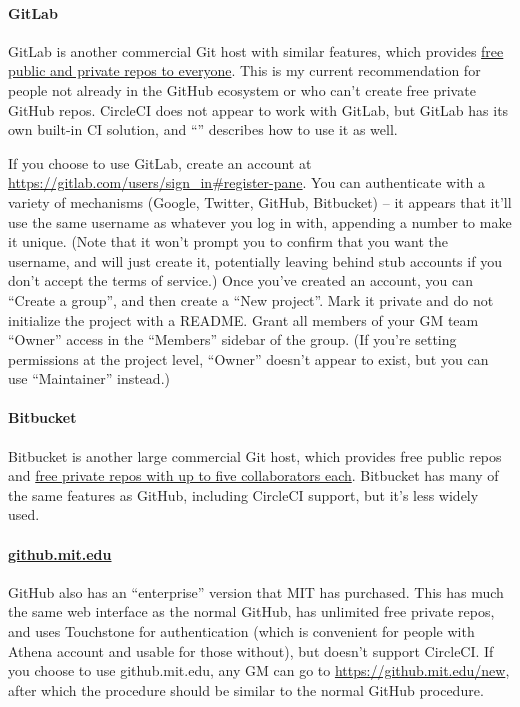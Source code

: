 \documentclass[green]{testgame}
\begin{document}
\paragraph*{GitLab} GitLab is another commercial Git host with similar features, which provides \href{https://about.gitlab.com/pricing/}{free public and private repos to everyone}. This is my current recommendation for people not already in the GitHub ecosystem or who can't create free private GitHub repos. CircleCI does not appear to work with GitLab, but GitLab has its own built-in CI solution, and ``\gCI{}'' describes how to use it as well.

If you choose to use GitLab, create an account at \url{https://gitlab.com/users/sign_in#register-pane}. You can authenticate with a variety of mechanisms (Google, Twitter, GitHub, Bitbucket) -- it appears that it'll use the same username as whatever you log in with, appending a number to make it unique. (Note that it won't prompt you to confirm that you want the username, and will just create it, potentially leaving behind stub accounts if you don't accept the terms of service.) Once you've created an account, you can ``Create a group'', and then create a ``New project''. Mark it private and do not initialize the project with a README. Grant all members of your GM team ``Owner'' access in the ``Members'' sidebar of the group. (If you're setting permissions at the project level, ``Owner'' doesn't appear to exist, but you can use ``Maintainer'' instead.)

\paragraph*{Bitbucket} Bitbucket is another large commercial Git host, which provides free public repos and \href{https://bitbucket.org/product/pricing/}{free private repos with up to five collaborators each}. Bitbucket has many of the same features as GitHub, including CircleCI support, but it's less widely used.

\paragraph*{\href{https://github.mit.edu}{github.mit.edu}} GitHub also has an ``enterprise'' version that MIT has purchased. This has much the same web interface as the normal GitHub, has unlimited free private repos, and uses Touchstone for authentication (which is convenient for people with Athena account and usable for those without), but doesn't support CircleCI. If you choose to use github.mit.edu, any GM can go to \url{https://github.mit.edu/new}, after which the procedure should be similar to the normal GitHub procedure.
\end{document}
